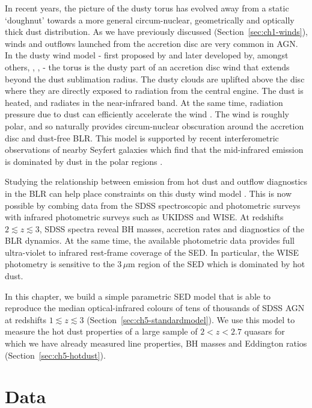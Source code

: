 In recent years, the picture of the dusty torus has evolved away from a static `doughnut' towards a more general circum-nuclear, geometrically and optically thick dust distribution. 
As we have previously discussed (Section~\ref{sec:ch1-winds}), winds and outflows launched from the accretion disc are very common in AGN. 
In the dusty wind model - first proposed by \citet{konigl94} and later developed by, amongst others, \citet{everett05}, \citet{elitzur06}, \citet{keating12} - the torus is the dusty part of an accretion disc wind that extends beyond the dust sublimation radius.  
The dusty clouds are uplifted above the disc where they are directly exposed to radiation from the central engine. 
The dust is heated, and radiates in the near-infrared band.
At the same time, radiation pressure due to dust can efficiently accelerate the wind \citep[e.g.][]{fabian12}. 
The wind is roughly polar, and so naturally provides circum-nuclear obscuration around the accretion disc and dust-free BLR.   
This model is supported by recent interferometric observations of nearby Seyfert galaxies which find that the mid-infrared emission is dominated by dust in the polar regions \citep[e.g.][]{raban09,honig12,honig13,tristram14,lopez-gonzaga16}.

Studying the relationship between emission from hot dust and outflow diagnostics in the BLR can help place constraints on this dusty wind model \citep[e.g.][]{wang13}. 
This is now possible by combing data from the SDSS spectroscopic and photometric surveys with infrared photometric surveys such as UKIDSS and WISE. 
At redshifts $2\lesssim z \lesssim3$, SDSS spectra reveal BH masses, accretion rates and diagnostics of the BLR dynamics. 
At the same time, the available photometric data provides full ultra-violet to infrared rest-frame coverage of the SED.
In particular, the WISE photometry is sensitive to the 3\,$\mu$m region of the SED which is dominated by hot dust. 

In this chapter, we build a simple parametric SED model that is able to reproduce the median optical-infrared colours of tens of thousands of SDSS AGN at redshifts $1 \lesssim z \lesssim 3$ (Section~\ref{sec:ch5-standardmodel}).
We use this model to measure the hot dust properties of a large sample of $2 < z < 2.7$ quasars for which we have already measured  line properties, BH masses and Eddington ratios (Section~\ref{sec:ch5-hotdust}).

\section{Data}

